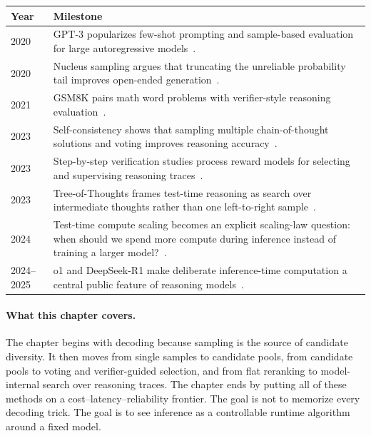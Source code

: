 \begin{center}
\begin{tabularx}{\textwidth}{@{}lX@{}}
\toprule
\textbf{Year} & \textbf{Milestone} \\
\midrule
2020 & GPT-3 popularizes few-shot prompting and sample-based evaluation for large autoregressive models~\cite{brown2020language}. \\
2020 & Nucleus sampling argues that truncating the unreliable probability tail improves open-ended generation~\cite{holtzman2020curious}. \\
2021 & GSM8K pairs math word problems with verifier-style reasoning evaluation~\cite{cobbe2021gsm8k}. \\
2023 & Self-consistency shows that sampling multiple chain-of-thought solutions and voting improves reasoning accuracy~\cite{wang2022selfconsistency}. \\
2023 & Step-by-step verification studies process reward models for selecting and supervising reasoning traces~\cite{lightman2023verify}. \\
2023 & Tree-of-Thoughts frames test-time reasoning as search over intermediate thoughts rather than one left-to-right sample~\cite{yao2023tree}. \\
2024 & Test-time compute scaling becomes an explicit scaling-law question: when should we spend more compute during inference instead of training a larger model?~\cite{snell2024scaling}. \\
2024--2025 & o1 and DeepSeek-R1 make deliberate inference-time computation a central public feature of reasoning models~\cite{openai2024reasoning,deepseekai2025r1}. \\
\bottomrule
\end{tabularx}
\end{center}

\paragraph{What this chapter covers.} The chapter begins with decoding because sampling is the source of candidate diversity. It then moves from single samples to candidate pools, from candidate pools to voting and verifier-guided selection, and from flat reranking to model-internal search over reasoning traces. The chapter ends by putting all of these methods on a cost--latency--reliability frontier. The goal is not to memorize every decoding trick. The goal is to see inference as a controllable runtime algorithm around a fixed model.


